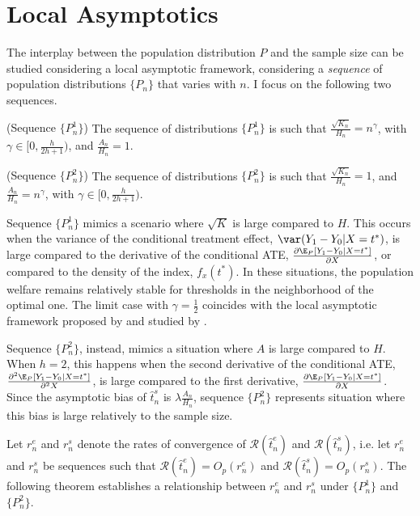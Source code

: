 {\section{Local Asymptotics} \label{app:local}

The interplay between the population distribution $P$ and the sample size can be studied considering a local asymptotic framework, considering a \textit{sequence} of population distributions $\{P_n\}$ that varies with $n$. I focus on the following two sequences.
\begin{df} \label{df:seq1}
    {\normalfont (Sequence $\{P^1_n\}$)} The sequence of distributions $\{P^1_n\}$ is such that $\frac{\sqrt{K_n}}{H_n} = n^\gamma $, with $\gamma \in [0,\frac{h}{2h + 1})$, and $\frac{A_n}{H_n} = 1 $.
\end{df}
\begin{df} \label{df:seq2}
    {\normalfont (Sequence $\{P^2_n\}$)} The sequence of distributions $\{P^2_n\}$ is such that $\frac{\sqrt{K_n}}{H_n} = 1 $, and $\frac{A_n}{H_n} = n^\gamma $, with $\gamma \in [0,\frac{h}{2h + 1})$.
\end{df}

Sequence $\{P^1_n\}$ mimics a scenario where $\sqrt{K}$ is large compared to $H$. This occurs when the variance of the conditional treatment effect, $\var (Y_1 -Y_0 |X=t^*)$, is large compared to the derivative of the conditional ATE, $\frac{\partial \E_P\left[Y_1 - Y_0 | X = t^* \right]}{\partial X}$, or compared to the density of the index, $f_x(t^*)$. In these situations, the population welfare remains relatively stable for thresholds in the neighborhood of the optimal one. The limit case with $\gamma = \frac{1}{2}$ coincides with the local asymptotic framework proposed by \cite{hirano2009asymptotics} and studied by \cite{athey2021policy}.

Sequence $\{P^2_n\}$, instead, mimics a situation where $A$ is large compared to $H$. When $h=2$, this happens when the second derivative of the conditional ATE, $\frac{\partial^2 \E_P\left[Y_1 - Y_0 | X = t^* \right]}{\partial^2 X}$, is large compared to the first derivative, $\frac{\partial \E_P\left[Y_1 - Y_0 | X = t^* \right]}{\partial X}$. Since the asymptotic bias of $\hat{t}^s_n$ is $\lambda \frac{A_n}{H_n}$, sequence $\{P^2_n\}$ represents situation where this bias is large relatively to the sample size.

Let $r_n^e$ and $r_n^s$ denote the rates of convergence of $\mathcal{R}(\hat{t}^e_n)$ and $\mathcal{R}(\hat{t}^s_n)$, i.e. let $r_n^e$ and $r_n^s$ be sequences such that $\mathcal{R}(\hat{t}^e_n) = O_p(r_n^e)$ and $\mathcal{R}(\hat{t}^s_n) = O_p(r_n^s)$. The following theorem establishes a relationship between $r_n^e$ and $r_n^s$ under $\{P^1_n\}$ and $\{P^2_n\}$.

}
